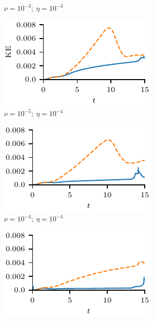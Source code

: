 \begin{figure}[t]
\begin{subfigure}{0.32\textwidth}
      \caption{$\nu = 10^{-3};\ \eta = 10^{-3}$}%
      \label{fig:v-3r-3_kinetic_energy_ps}
    \end{subfigure}
    \hfill
    \begin{subfigure}{0.32\textwidth}
      \centering
      \includegraphics[width=1.0\linewidth]{param_study/v-5r-4_kinetic_energy.pdf}
      \caption{$\nu = 10^{-5};\ \eta = 10^{-4}$}%
      \label{fig:v-5r-4_kinetic_energy_ps}
    \end{subfigure}
    \hfill
    \begin{subfigure}{0.32\textwidth}
      \centering
      \includegraphics[width=1.0\linewidth]{param_study/v-4r-4_kinetic_energy.pdf}
      \caption{$\nu = 10^{-4};\ \eta = 10^{-4}$}%
      \label{fig:v-4r-4_kinetic_energy_ps}
    \end{subfigure}
    \hfill
    \begin{subfigure}{0.32\textwidth}
      \centering
      \includegraphics[width=1.0\linewidth]{param_study/v-3r-4_kinetic_energy.pdf}

\end{subfigure}
\end{figure}
